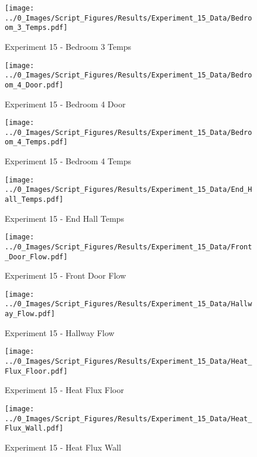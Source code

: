	\begin{figure}[H]
		\centering
		\texttt{[image: ../0\_Images/Script\_Figures/Results/Experiment\_15\_Data/Bedroom\_3\_Temps.pdf]}
		\caption[]{Experiment 15 - Bedroom 3 Temps}
	\end{figure}
 
	\clearpage

	\begin{figure}[H]
		\centering
		\texttt{[image: ../0\_Images/Script\_Figures/Results/Experiment\_15\_Data/Bedroom\_4\_Door.pdf]}
		\caption[]{Experiment 15 - Bedroom 4 Door}
	\end{figure}
 

	\begin{figure}[H]
		\centering
		\texttt{[image: ../0\_Images/Script\_Figures/Results/Experiment\_15\_Data/Bedroom\_4\_Temps.pdf]}
		\caption[]{Experiment 15 - Bedroom 4 Temps}
	\end{figure}
 
	\clearpage

	\begin{figure}[H]
		\centering
		\texttt{[image: ../0\_Images/Script\_Figures/Results/Experiment\_15\_Data/End\_Hall\_Temps.pdf]}
		\caption[]{Experiment 15 - End Hall Temps}
	\end{figure}
 

	\begin{figure}[H]
		\centering
		\texttt{[image: ../0\_Images/Script\_Figures/Results/Experiment\_15\_Data/Front\_Door\_Flow.pdf]}
		\caption[]{Experiment 15 - Front Door Flow}
	\end{figure}
 
	\clearpage

	\begin{figure}[H]
		\centering
		\texttt{[image: ../0\_Images/Script\_Figures/Results/Experiment\_15\_Data/Hallway\_Flow.pdf]}
		\caption[]{Experiment 15 - Hallway Flow}
	\end{figure}
 

	\begin{figure}[H]
		\centering
		\texttt{[image: ../0\_Images/Script\_Figures/Results/Experiment\_15\_Data/Heat\_Flux\_Floor.pdf]}
		\caption[]{Experiment 15 - Heat Flux Floor}
	\end{figure}
 
	\clearpage

	\begin{figure}[H]
		\centering
		\texttt{[image: ../0\_Images/Script\_Figures/Results/Experiment\_15\_Data/Heat\_Flux\_Wall.pdf]}
		\caption[]{Experiment 15 - Heat Flux Wall}
	\end{figure}
 


